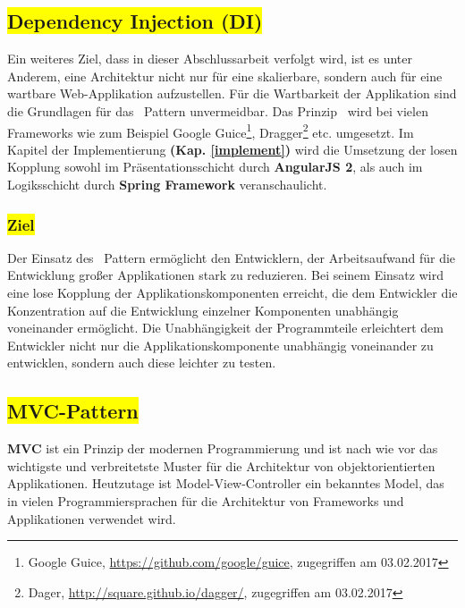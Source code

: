 \subsection{\colorbox{yellow}{Dependency Injection (DI)}}\label{di}

Ein weiteres Ziel, dass in dieser Abschlussarbeit verfolgt wird, ist es unter Anderem, eine Architektur nicht nur für eine skalierbare, sondern auch für eine wartbare Web-Applikation aufzustellen. Für die Wartbarkeit der Applikation sind die Grundlagen für das \di\ Pattern unvermeidbar. Das Prinzip \di\ wird bei vielen Frameworks wie zum Beispiel Google Guice\footnote{Google Guice, \url{https://github.com/google/guice}, zugegriffen am 03.02.2017}, Dragger\footnote{Dager, \url{http://square.github.io/dagger/}, zugegriffen am 03.02.2017} etc. umgesetzt. Im Kapitel der Implementierung \textbf{(Kap. \ref{implement})} wird die Umsetzung der losen Kopplung sowohl im Präsentationsschicht durch \textbf{AngularJS 2}, als auch im Logiksschicht durch \textbf{Spring Framework} veranschaulicht.

\subsubsection{\colorbox{yellow}{Ziel}}

Der Einsatz des \di\ Pattern ermöglicht den Entwicklern, der Arbeitsaufwand für die Entwicklung großer Applikationen stark zu reduzieren. Bei seinem Einsatz wird eine lose Kopplung der Applikationskomponenten erreicht, die dem Entwickler die Konzentration auf die Entwicklung einzelner Komponenten unabhängig voneinander ermöglicht. Die Unabhängigkeit der Programmteile erleichtert dem Entwickler nicht nur die Applikationskomponente unabhängig voneinander zu entwicklen, sondern auch diese leichter zu testen. 

\subsection{\colorbox{yellow}{MVC-Pattern}}\label{mvc}

\textbf{MVC} ist ein Prinzip der modernen Programmierung und ist nach wie vor das wichtigste und verbreitetste Muster für die Architektur von objektorientierten Applikationen. Heutzutage ist Model-View-Controller ein bekanntes Model, das in vielen Programmiersprachen für die Architektur von Frameworks und Applikationen verwendet wird.

